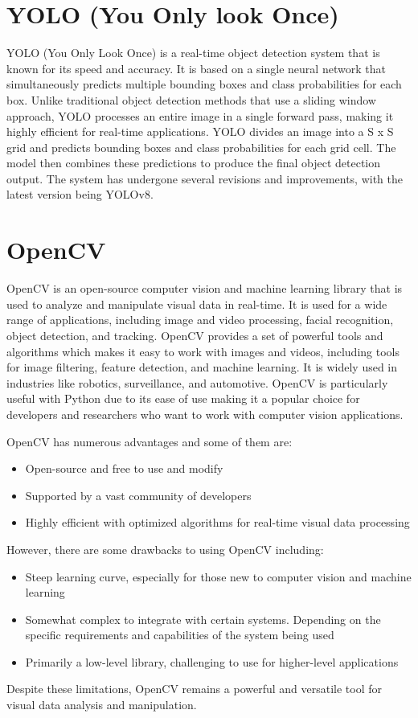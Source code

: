 \section{YOLO (You Only look Once)}
YOLO (You Only Look Once) is a real-time object detection system that is known for its speed and accuracy. It is based on a single neural network that simultaneously predicts multiple bounding boxes and class probabilities for each box. Unlike traditional object detection methods that use a sliding window approach, YOLO processes an entire image in a single forward pass, making it highly efficient for real-time applications.
YOLO divides an image into a S x S grid and predicts bounding boxes and class probabilities for each grid cell. The model then combines these predictions to produce the final object detection output. 
The system has undergone several revisions and improvements, with the latest version being YOLOv8.

\section{OpenCV}
OpenCV is an open-source computer vision and machine learning library that is used to analyze and manipulate visual data in real-time. It is used for a wide range of applications, including image and video processing, facial recognition, object detection, and tracking. OpenCV provides a set of powerful tools and algorithms which makes it easy to work with images and videos, including tools for image filtering, feature detection, and machine learning. It is widely used in industries like robotics, surveillance, and automotive. OpenCV is particularly useful with Python due to its ease of use making it a popular choice for developers and researchers who want to work with computer vision applications.

OpenCV has numerous advantages and some of them are:
\begin{itemize}
\item Open-source and free to use and modify 
\item Supported by a vast community of developers 
\item Highly efficient with optimized algorithms for real-time visual data 
processing
\end{itemize}

However, there are some drawbacks to using OpenCV including: 
\begin{itemize}
\item Steep learning curve, especially for those new to computer vision and machine learning 
\item Somewhat complex to integrate with certain systems. Depending on the specific requirements and capabilities of the system being used
\item Primarily a low-level library, challenging to use for higher-level applications 
\end{itemize}
Despite these limitations, OpenCV remains a powerful and versatile tool for visual data analysis and manipulation.


